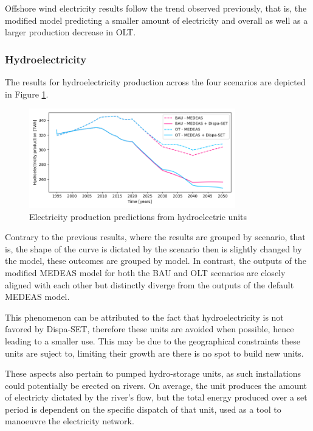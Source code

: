 Offshore wind electricity results follow the trend observed previously, that is, the modified model predicting a smaller amount of electricity and overall as well as a larger production decrease in OLT.

\subsubsection{Hydroelectricity}

The results for hydroelectricity production across the four scenarios are depicted in Figure \ref{fig:electricity-production-hydro}.

\begin{figure}[h]
    \centering
    \includegraphics[width=0.8\textwidth]{resources/images/electricity-production-hydro.png}
    \caption{Electricity production predictions from hydroelectric units}
    \label{fig:electricity-production-hydro}
\end{figure}

Contrary to the previous results, where the results are grouped by scenario, that is, the shape of the curve is dictated by the scenario then is slightly changed by the model, these outcomes are grouped by model. In contrast, the outputs of the modified MEDEAS model for both the BAU and OLT scenarios are closely aligned with each other but distinctly diverge from the outputs of the default MEDEAS model.

This phenomenon can be attributed to the fact that hydroelectricity is not favored by Dispa-SET, therefore these units are avoided when possible, hence leading to a smaller use. This may be due to the geographical constraints these units are suject to, limiting their growth are there is no spot to build new units.

These aspects also pertain to pumped hydro-storage units, as such installations could potentially be erected on rivers. On average, the unit produces the amount of electricty dictated by the river's flow, but the total energy produced over a set period is dependent on the specific dispatch of that unit, used as a tool to manoeuvre the electricity network.

